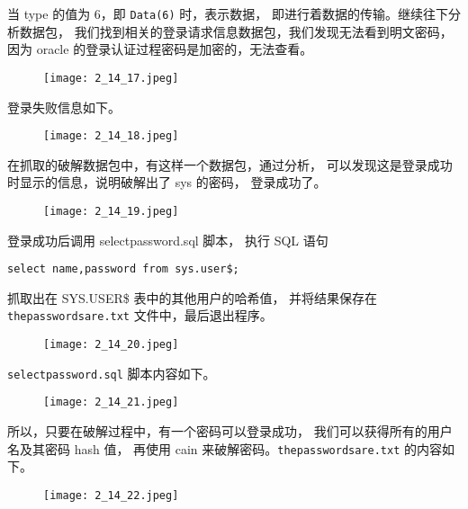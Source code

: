 当 type 的值为 6，即 \texttt{Data(6)} 时，表示数据，
即进行着数据的传输。继续往下分析数据包，
我们找到相关的登录请求信息数据包，我们发现无法看到明文密码，
因为 oracle 的登录认证过程密码是加密的，无法查看。
\begin{figure}[H]
  \begin{center}
    \texttt{[image: 2\_14\_17.jpeg]}
  \end{center}
\end{figure}

登录失败信息如下。
\begin{figure}[H]
  \begin{center}
    \texttt{[image: 2\_14\_18.jpeg]}
  \end{center}
\end{figure}

在抓取的破解数据包中，有这样一个数据包，通过分析，
可以发现这是登录成功时显示的信息，说明破解出了 sys 的密码，
登录成功了。
\begin{figure}[H]
  \begin{center}
    \texttt{[image: 2\_14\_19.jpeg]}
  \end{center}
\end{figure}

登录成功后调用 selectpassword.sql 脚本，
执行 SQL 语句
\begin{verbatim}
select name,password from sys.user$;
\end{verbatim}
抓取出在 SYS.USER\$ 表中的其他用户的哈希值，
并将结果保存在 \texttt{thepasswordsare.txt} 文件中，最后退出程序。
\begin{figure}[H]
  \begin{center}
    \texttt{[image: 2\_14\_20.jpeg]}
  \end{center}
\end{figure}

\texttt{selectpassword.sql} 脚本内容如下。
\begin{figure}[H]
  \begin{center}
    \texttt{[image: 2\_14\_21.jpeg]}
  \end{center}
\end{figure}

所以，只要在破解过程中，有一个密码可以登录成功，
我们可以获得所有的用户名及其密码 hash 值，
再使用 cain 来破解密码。\texttt{thepasswordsare.txt} 的内容如下。
\begin{figure}[H]
  \begin{center}
    \texttt{[image: 2\_14\_22.jpeg]}
  \end{center}
\end{figure}
%
